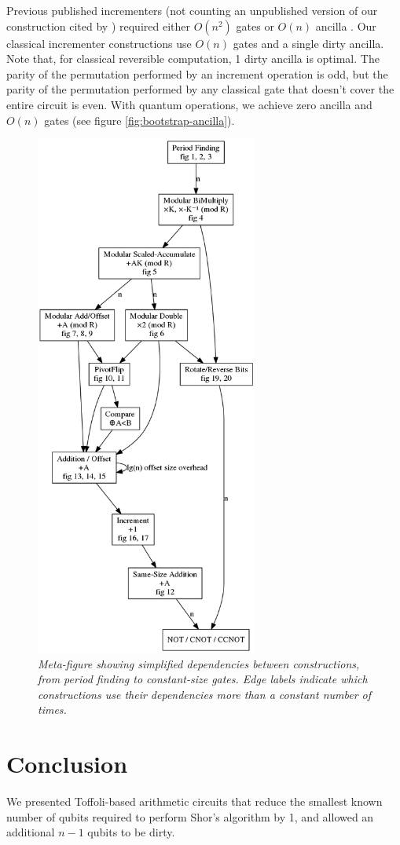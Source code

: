 \documentclass[twocolumn]{article}
\begin{document}
Previous published incrementers (not counting an unpublished version of our construction \cite{gidney2015} cited by \cite{haner2016}) required either $O(n^2)$ gates or $O(n)$ ancilla \cite{draper2000, barenco1995}.
Our classical incrementer constructions use $O(n)$ gates and a single dirty ancilla.
Note that, for classical reversible computation, 1 dirty ancilla is optimal.
The parity of the permutation performed by an increment operation is odd, but the parity of the permutation performed by any classical gate that doesn't cover the entire circuit is even.
With quantum operations, we achieve zero ancilla and $O(n)$ gates (see figure \ref{fig:bootstrap-ancilla}).

\begin{figure}
  \centering
  \includegraphics[height=17.3cm]{assets/dependencies.png}
  \caption{\em
    Meta-figure showing simplified dependencies between constructions, from period finding to constant-size gates.
    Edge labels indicate which constructions use their dependencies more than a constant number of times.
  }
  \label{fig:dependencies}
\end{figure}


\section{Conclusion} \label{sec:conclusion}

We presented Toffoli-based arithmetic circuits that reduce the smallest known number of qubits required to perform Shor's algorithm by 1, and allowed an additional $n-1$ qubits to be dirty.



\end{document}
